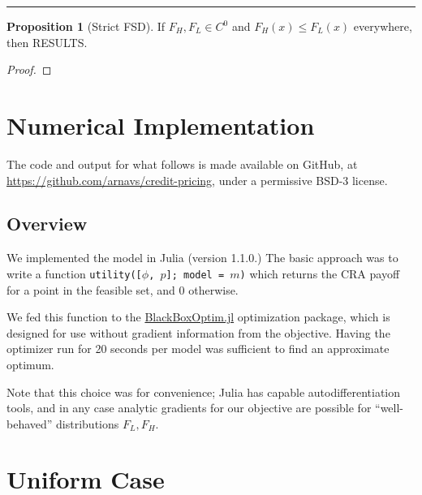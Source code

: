 \documentclass{article}
\theoremstyle{definition}
\newtheorem{proposition}{Proposition}
\begin{document}
\hrule \hspace{5 em} 



\begin{proposition}[Strict FSD] If $F_H, F_L \in C^0$ and $F_H(x) \leq F_L(x)$ everywhere, then RESULTS.
\end{proposition}

\begin{proof}
\end{proof} 

\newpage

\section{Numerical Implementation}

The code and output for what follows is made available on GitHub, at \url{https://github.com/arnavs/credit-pricing}, under a permissive BSD-3 license.

\subsection{Overview}

We implemented the model in Julia (version 1.1.0.) The basic approach was to write a function \texttt{utility([$\phi$, $p$]; model = $m$)} which returns the CRA payoff for a point in the feasible set, and 0 otherwise.

We fed this function to the \href{https://github.com/robertfeldt/BlackBoxOptim.jl}{\color{blue} BlackBoxOptim.jl} optimization package, which is designed for use without gradient information from the objective. Having the optimizer run for 20 seconds per model was sufficient to find an approximate optimum. 

Note that this choice was for convenience; Julia has capable autodifferentiation tools, and in any case analytic gradients for our objective are possible for ``well-behaved'' distributions $F_L, F_H$.

\newpage 

\section{Uniform Case}
\end{document}

